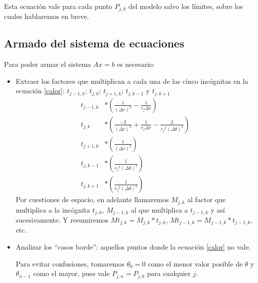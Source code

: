 Esta ecuación vale para cada punto $P_{j, k}$ del modelo salvo los límites, sobre los cuales hablaremos en breve.

\subsection{Armado del sistema de ecuaciones}
Para poder armar el sistema $Ax=b$ es necesario:
\begin{itemize}
 \item
    Extraer los factores que multiplican a cada una de las cinco incógnitas en la ecuación \ref{calor}: $t_{j-1,k}$; $t_{j,k}$; $t_{j+1,k}$; $t_{j,k-1}$ y $t_{j,k+1}$
    \begin{align*}
        t_{j-1, k}&*\left(\frac{1}{(\Delta r)^2} - \frac{1}{r_j \Delta r}\right) \\
        t_{j, k}  &*\left(\frac{-2}{(\Delta r)^2} + \frac{1}{r_j \Delta r} - \frac{2}{{r_j}^2 (\Delta \theta)^2}\right) \\
        t_{j+1, k}&*\left(\frac{1}{(\Delta r)^2}\right) \\
        t_{j, k-1}&*\left(\frac{1}{{r_j}^2(\Delta \theta)^2}\right) \\
        t_{j, k+1}&*\left(\frac{1}{{r_j}^2(\Delta \theta)^2}\right)
    \end{align*}
    Por cuestiones de espacio, en adelante llamaremos $M_{j,k}$ al factor que multiplica a la incógnita $t_{j,k}$, $M_{j-1,k}$ al que multiplica a $t_{j-1,k}$ y así sucesivamente. Y resumiremos $Mt_{j,k} = M_{j,k}*t_{j,k}$, $Mt_{j-1,k}=M_{j-1,k}*t_{j-1,k}$, etc.
 \item
    Analizar los ``casos borde'': aquellos puntos donde la ecuación \ref{calor} no vale.
    
    Para evitar confusiones, tomaremos $\theta_0 = 0$ como el menor valor posible de $\theta$ y $\theta_{n-1}$ como el mayor, pues vale $P_{j, n} = P_{j, 0}$ para cualquier $j$. 
    

\end{itemize}
